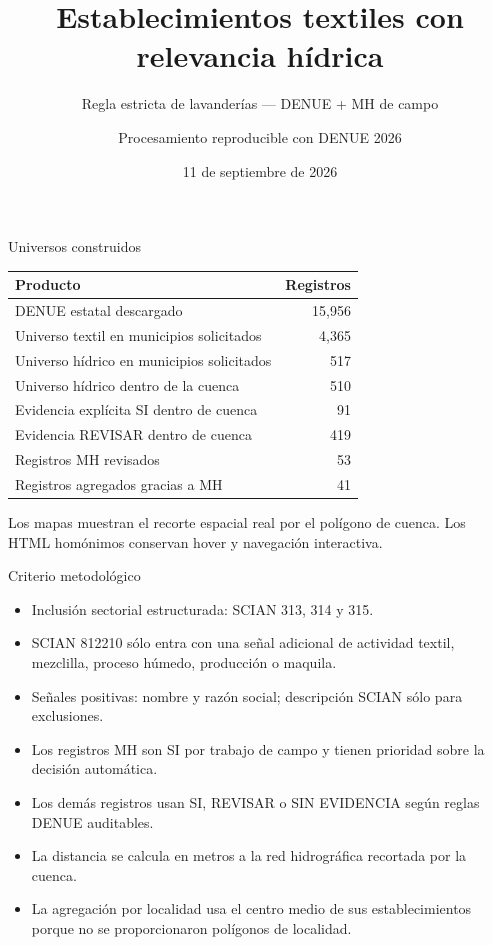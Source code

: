 \documentclass[aspectratio=169]{beamer}
\title{Establecimientos textiles con relevancia hídrica}
\subtitle{Regla estricta de lavanderías — DENUE + MH de campo}
\author{Procesamiento reproducible con DENUE 2026}
\date{11 de septiembre de 2026}
\begin{document}
\begin{frame}\titlepage\end{frame}
\begin{frame}{Universos construidos}
\centering
\begin{tabular}{lr}\toprule
Producto & Registros\\\midrule
DENUE estatal descargado & 15,956\\
Universo textil en municipios solicitados & 4,365\\
Universo hídrico en municipios solicitados & 517\\
Universo hídrico dentro de la cuenca & 510\\
Evidencia explícita SI dentro de cuenca & 91\\
Evidencia REVISAR dentro de cuenca & 419\\
Registros MH revisados & 53\\
Registros agregados gracias a MH & 41\\
\bottomrule\end{tabular}
\vfill
Los mapas muestran el recorte espacial real por el polígono de cuenca. Los HTML homónimos conservan hover y navegación interactiva.
\end{frame}
\begin{frame}{Criterio metodológico}
\begin{itemize}
\item Inclusión sectorial estructurada: SCIAN 313, 314 y 315.
\item SCIAN 812210 sólo entra con una señal adicional de actividad textil, mezclilla, proceso húmedo, producción o maquila.
\item Señales positivas: nombre y razón social; descripción SCIAN sólo para exclusiones.
\item Los registros MH son SI por trabajo de campo y tienen prioridad sobre la decisión automática.
\item Los demás registros usan SI, REVISAR o SIN EVIDENCIA según reglas DENUE auditables.
\item La distancia se calcula en metros a la red hidrográfica recortada por la cuenca.
\item La agregación por localidad usa el centro medio de sus establecimientos porque no se proporcionaron polígonos de localidad.
\end{itemize}
\end{frame}
\end{document}

